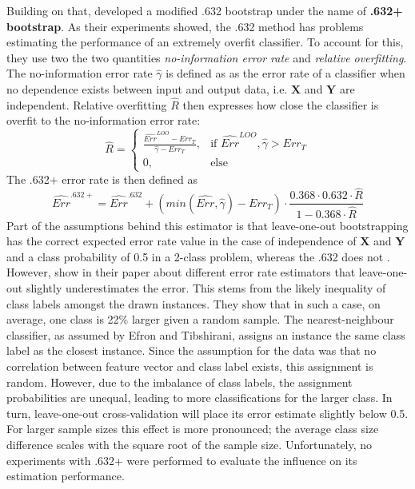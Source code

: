 Building on that, \cite{EfronEtAl1997} developed a modified .632 bootstrap under the name of \textbf{.632+ bootstrap}. As their experiments showed, the .632 method has problems estimating the performance of an extremely overfit classifier. To account for this, they use two the two quantities \textit{no-information error rate} and \textit{relative overfitting}. The no-information error rate $\hat{\gamma}$ is defined as as the error rate of a classifier when no dependence exists between input and output data, i.e. $\mathbf{X}$ and $\mathbf{Y}$ are independent. Relative overfitting $\hat{R}$ then expresses how close the classifier is overfit to the no-information error rate:
\begin{equation}
\hat{R} =
\begin{cases}
	\frac{\widehat{Err}^{LOO} - Err_T}{\hat{\gamma} - Err_T}, & \text{if } \widehat{Err}^{LOO}, \hat{\gamma} > Err_T \\
	0, & \text{else}
\end{cases}
\end{equation}
The .632+ error rate is then defined as
\begin{equation}
\widehat{Err}^{.632+} = \widehat{Err}^{.632} + \left(min(\widehat{Err}, \hat{\gamma}) - Err_T\right) \cdot \frac{0.368 \cdot 0.632 \cdot \hat{R}}{1 - 0.368 \cdot \hat{R}}
\end{equation}
Part of the assumptions behind this estimator is that leave-one-out bootstrapping has the correct expected error rate value in the case of independence of $\mathbf{X}$ and $\mathbf{Y}$ and a class probability of 0.5 in a 2-class problem, whereas the .632 does not \cite{EfronEtAl1997}. However, \cite{WoodEtAl2007} show in their paper about different error rate estimators that leave-one-out slightly underestimates the error. This stems from the likely inequality of class labels amongst the drawn instances. They show that in such a case, on average, one class is 22\% larger given a random sample. The nearest-neighbour classifier, as assumed by Efron and Tibshirani, assigns an instance the same class label as the closest instance. Since the assumption for the data was that no correlation between feature vector and class label exists, this assignment is random. However, due to the imbalance of class labels, the assignment probabilities are unequal, leading to more classifications for the larger class. In turn, leave-one-out cross-validation will place its error estimate slightly below 0.5. For larger sample sizes this effect is more pronounced; the average class size difference scales with the square root of the sample size. Unfortunately, no experiments with .632+ were performed to evaluate the influence on its estimation performance.

